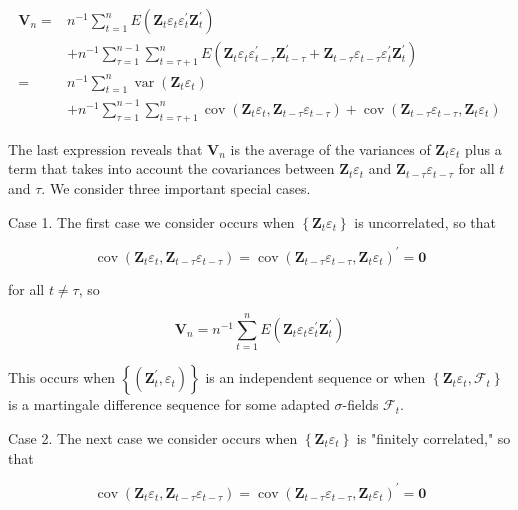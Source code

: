 \documentclass[10pt]{article}
\begin{document}
$$
\begin{aligned}
\mathbf{V}_{n}= & n^{-1} \sum_{t=1}^{n} E\left(\mathbf{Z}_{t} \varepsilon_{t} \varepsilon_{t}^{\prime} \mathbf{Z}_{t}^{\prime}\right) \\
& +n^{-1} \sum_{\tau=1}^{n-1} \sum_{t=\tau+1}^{n} E\left(\mathbf{Z}_{t} \varepsilon_{t} \varepsilon_{t-\tau}^{\prime} \mathbf{Z}_{t-\tau}^{\prime}+\mathbf{Z}_{t-\tau} \varepsilon_{t-\tau} \varepsilon_{t}^{\prime} \mathbf{Z}_{t}^{\prime}\right) \\
= & n^{-1} \sum_{t=1}^{n} \operatorname{var}\left(\mathbf{Z}_{t} \varepsilon_{t}\right) \\
& +n^{-1} \sum_{\tau=1}^{n-1} \sum_{t=\tau+1}^{n} \operatorname{cov}\left(\mathbf{Z}_{t} \varepsilon_{t}, \mathbf{Z}_{t-\tau} \varepsilon_{t-\tau}\right)+\operatorname{cov}\left(\mathbf{Z}_{t-\tau} \varepsilon_{t-\tau}, \mathbf{Z}_{t} \varepsilon_{t}\right)
\end{aligned}
$$

The last expression reveals that $\mathbf{V}_{n}$ is the average of the variances of $\mathbf{Z}_{t} \varepsilon_{t}$ plus a term that takes into account the covariances between $\mathbf{Z}_{t} \varepsilon_{t}$ and $\mathbf{Z}_{t-\tau} \varepsilon_{t-\tau}$ for all $t$ and $\tau$. We consider three important special cases.

Case 1. The first case we consider occurs when $\left\{\mathbf{Z}_{t} \varepsilon_{t}\right\}$ is uncorrelated, so that

$$
\operatorname{cov}\left(\mathbf{Z}_{t} \varepsilon_{t}, \mathbf{Z}_{t-\tau} \varepsilon_{t-\tau}\right)=\operatorname{cov}\left(\mathbf{Z}_{t-\tau} \varepsilon_{t-\tau}, \mathbf{Z}_{t} \varepsilon_{t}\right)^{\prime}=\mathbf{0}
$$

for all $t \neq \tau$, so

$$
\mathbf{V}_{n}=n^{-1} \sum_{t=1}^{n} E\left(\mathbf{Z}_{t} \varepsilon_{t} \varepsilon_{t}^{\prime} \mathbf{Z}_{t}^{\prime}\right)
$$

This occurs when $\left\{\left(\mathbf{Z}_{t}^{\prime}, \varepsilon_{t}\right)\right\}$ is an independent sequence or when $\left\{\mathbf{Z}_{t} \varepsilon_{t}, \mathcal{F}_{t}\right\}$ is a martingale difference sequence for some adapted $\sigma$-fields $\mathcal{F}_{t}$.

Case 2. The next case we consider occurs when $\left\{\mathbf{Z}_{t} \varepsilon_{t}\right\}$ is "finitely correlated," so that

$$
\operatorname{cov}\left(\mathbf{Z}_{t} \varepsilon_{t}, \mathbf{Z}_{t-\tau} \varepsilon_{t-\tau}\right)=\operatorname{cov}\left(\mathbf{Z}_{t-\tau} \varepsilon_{t-\tau}, \mathbf{Z}_{t} \varepsilon_{t}\right)^{\prime}=\mathbf{0}
$$
\end{document}
